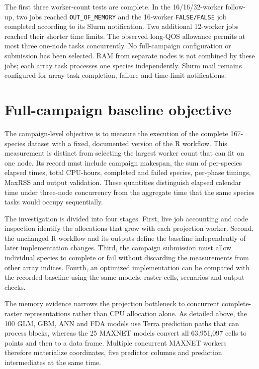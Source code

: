 The first three worker-count tests are complete. In the 16/16/32-worker follow-up, two jobs reached \texttt{OUT\_OF\_MEMORY} and the 16-worker \texttt{FALSE/FALSE} job completed according to its Slurm notification. Two additional 12-worker jobs reached their shorter time limits. The observed long-QOS allowance permits at most three one-node tasks concurrently. No full-campaign configuration or submission has been selected. RAM from separate nodes is not combined by these jobs; each array task processes one species independently. Slurm mail remains configured for array-task completion, failure and time-limit notifications.

\section{Full-campaign baseline objective}

The campaign-level objective is to measure the execution of the complete 167-species dataset with a fixed, documented version of the R workflow. This measurement is distinct from selecting the largest worker count that can fit on one node. Its record must include campaign makespan, the sum of per-species elapsed times, total CPU-hours, completed and failed species, per-phase timings, MaxRSS and output validation. These quantities distinguish elapsed calendar time under three-node concurrency from the aggregate time that the same species tasks would occupy sequentially.

The investigation is divided into four stages. First, live job accounting and code inspection identify the allocations that grow with each projection worker. Second, the unchanged R workflow and its outputs define the baseline independently of later implementation changes. Third, the campaign submission must allow individual species to complete or fail without discarding the measurements from other array indices. Fourth, an optimized implementation can be compared with the recorded baseline using the same models, raster cells, scenarios and output checks.

The memory evidence narrows the projection bottleneck to concurrent complete-raster representations rather than CPU allocation alone. As detailed above, the 100 GLM, GBM, ANN and FDA models use Terra prediction paths that can process blocks, whereas the 25 MAXNET models convert all 63,951,097 cells to points and then to a data frame. Multiple concurrent MAXNET workers therefore materialize coordinates, five predictor columns and prediction intermediates at the same time.

